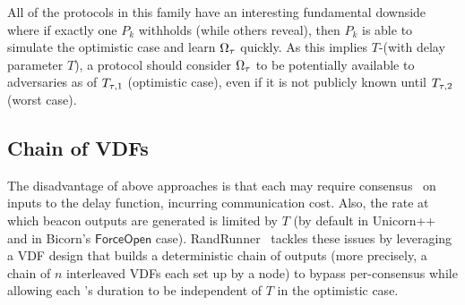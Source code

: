 All of the protocols in this family have an interesting fundamental downside where if exactly one $P_k$ withholds (while others reveal), then $P_k$ is able to simulate the optimistic case and learn $\Omega_\tau$ quickly. As this implies $T$-\intraunpredictability (with delay parameter $T$), a protocol should consider $\Omega_\tau$ to be potentially available to adversaries as of $T_{\tau, 1}$ (optimistic case), even if it is not publicly known until $T_{\tau, 2}$ (worst case).

\subsection{Chain of VDFs}
\label{subsection:randrunner}
The disadvantage of above approaches is that each \epoch may require consensus~\cite{castro1999practical} on inputs to the delay function, incurring communication cost.
Also, the rate at which beacon outputs are generated is limited by $T$ (by default in Unicorn++ and in Bicorn's $\mathsf{ForceOpen}$ case).
RandRunner~\cite{schindler2021randrunner} tackles these issues by leveraging a VDF design that builds a deterministic chain of outputs (more precisely, a chain of $n$ interleaved VDFs each set up by a node) to bypass per-\epoch consensus while allowing each \epoch's duration to be independent of $T$ in the optimistic case.


